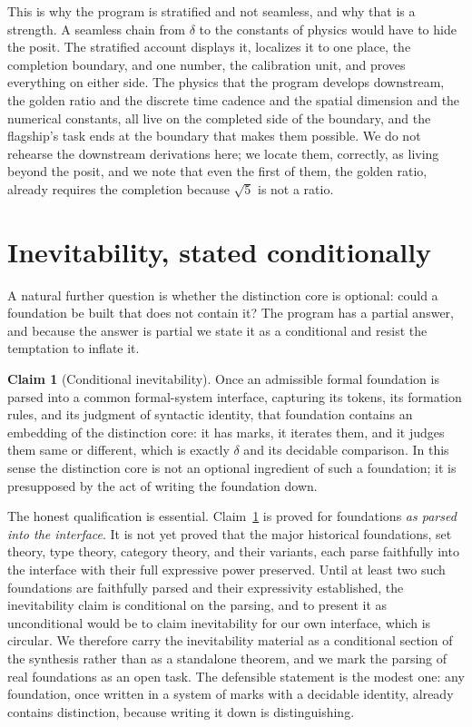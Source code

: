\documentclass[11pt,a4paper]{article}
\theoremstyle{definition}
\newtheorem{claim}[theorem]{Claim}
\theoremstyle{remark}
\begin{document}
This is why the program is stratified and not seamless, and why that is a strength.
A seamless chain from $\delta$ to the constants of physics would have to hide the
posit. The stratified account displays it, localizes it to one place, the
completion boundary, and one number, the calibration unit, and proves everything on
either side. The physics that the program develops downstream, the golden ratio and
the discrete time cadence and the spatial dimension and the numerical constants,
all live on the completed side of the boundary, and the flagship's task ends at the
boundary that makes them possible. We do not rehearse the downstream derivations
here; we locate them, correctly, as living beyond the posit, and we note that even
the first of them, the golden ratio, already requires the completion because
$\sqrt 5$ is not a ratio.

\section{Inevitability, stated conditionally}\label{sec:inev}

A natural further question is whether the distinction core is optional: could a
foundation be built that does not contain it? The program has a partial answer, and
because the answer is partial we state it as a conditional and resist the
temptation to inflate it.

\begin{claim}[Conditional inevitability]\label{cl:inev}
Once an admissible formal foundation is parsed into a common formal-system
interface, capturing its tokens, its formation rules, and its judgment of
syntactic identity, that foundation contains an embedding of the distinction core:
it has marks, it iterates them, and it judges them same or different, which is
exactly $\delta$ and its decidable comparison. In this sense the distinction core
is not an optional ingredient of such a foundation; it is presupposed by the act
of writing the foundation down.
\end{claim}

The honest qualification is essential. Claim~\ref{cl:inev} is proved for
foundations \emph{as parsed into the interface}. It is not yet proved that the major
historical foundations, set theory, type theory, category theory, and their
variants, each parse faithfully into the interface with their full expressive
power preserved. Until at least two such foundations are faithfully parsed and
their expressivity established, the inevitability claim is conditional on the
parsing, and to present it as unconditional would be to claim inevitability for our
own interface, which is circular. We therefore carry the inevitability material as
a conditional section of the synthesis rather than as a standalone theorem, and we
mark the parsing of real foundations as an open task. The defensible statement is
the modest one: any foundation, once written in a system of marks with a decidable
identity, already contains distinction, because writing it down is distinguishing.
\end{document}
